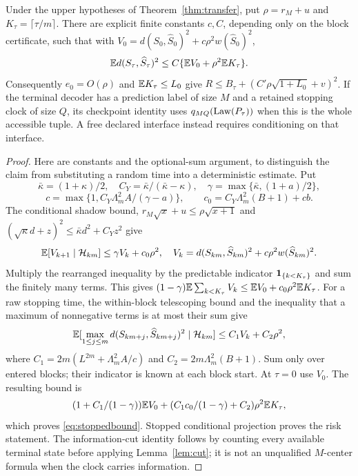 \begin{proposition}\label{prop:stopped}
Under the upper hypotheses of Theorem~\ref{thm:transfer}, put $\rho=r_M+u$ and $K_\tau=\lceil\tau/m\rceil$. There are explicit finite constants $c,C$, depending only on the block certificate, such that with
$V_0=d(S_0,\widehat S_0)^2+c\rho^2w(\widehat S_0)^2$,
\begin{equation}\label{eq:stoppedbound}
 \mathbb E d(S_\tau,\widehat S_\tau)^2
 \le C\{\mathbb E V_0+\rho^2\mathbb E K_\tau\}.
\end{equation}
Consequently $e_0=O(\rho)$ and $\mathbb E K_\tau\le L_0$ give
$R\le B_\tau+(C'\rho\sqrt{1+L_0}+v)^2$.
If the terminal decoder has a prediction label of size $M$ and a retained stopping clock of size $Q$, its checkpoint identity uses $q_{MQ}(\operatorname{Law}(P_\tau))$ when this is the whole accessible tuple. A free declared interface instead requires conditioning on that interface.
\end{proposition}
\begin{proof}
Here are constants and the optional-sum argument, to distinguish the claim from substituting a random time into a deterministic estimate. Put
\[
 \bar\kappa=(1+\kappa)/2,\quad C_Y=\bar\kappa/(\bar\kappa-\kappa),
 \quad\gamma=\max\{\bar\kappa,(1+a)/2\},
\]
\[
 c=\max\{1,C_Y\Lambda_m^2A/(\gamma-a)\},\qquad
 c_0=C_Y\Lambda_m^2(B+1)+cb.
\]
The conditional shadow bound, $r_M\sqrt{x}+u\le\rho\sqrt{x+1}$ and
$(\sqrt\kappa d+z)^2\le\bar\kappa d^2+C_Yz^2$ give
\[
 \mathbb E[V_{k+1}\mid\mathcal H_{km}]\le\gamma V_k+c_0\rho^2,
 \quad V_k=d(S_{km},\widehat S_{km})^2+c\rho^2w(\widehat S_{km})^2.
\]
Multiply the rearranged inequality by the predictable indicator $\mathbf 1_{\{k<K_\tau\}}$ and sum the finitely many terms. This gives
$(1-\gamma)\mathbb E\sum_{k<K_\tau}V_k\le\mathbb E V_0+c_0\rho^2\mathbb E K_\tau$.
For a raw stopping time, the within-block telescoping bound and the inequality that a maximum of nonnegative terms is at most their sum give
\[
 \mathbb E[\max_{1\le j\le m}d(S_{km+j},\widehat S_{km+j})^2\mid\mathcal H_{km}]
 \le C_1V_k+C_2\rho^2,
\]
where $C_1=2m(L^{2m}+\Lambda_m^2A/c)$ and $C_2=2m\Lambda_m^2(B+1)$. Sum only over entered blocks; their indicator is known at each block start. At $\tau=0$ use $V_0$. The resulting bound is
\[
 (1+C_1/(1-\gamma))\mathbb E V_0+
 (C_1c_0/(1-\gamma)+C_2)\rho^2\mathbb E K_\tau,
\]
which proves \eqref{eq:stoppedbound}. Stopped conditional projection proves the risk statement. The information-cut identity follows by counting every available terminal state before applying Lemma~\ref{lem:cut}; it is not an unqualified $M$-center formula when the clock carries information.
\end{proof}

